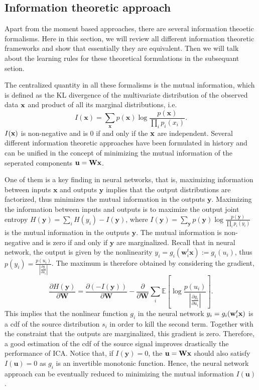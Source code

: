 \documentclass[aps,prl,preprint,superscriptaddress]{revtex4-2}
\begin{document}
\subsection{Information theoretic approach}

Apart from the moment based approaches, there are several information theoetic formalisms. Here in this section, we will review all different information theoretic frameworks and show that essentially they are equivalent. Then we will talk about the learning rules for these theoretical formulations in the subsequant setion. 

The centralized quantity in all these formalisms is the mutual information, which is defined as the KL divergence of the multivariate distribution of the observed data $\bf{x}$ and product of all its marginal distributions, i.e. 
\begin{equation}
I(\mathbf{x}) = \sum_{\mathbf{x}}p(\mathbf{x})\log\frac{p(\mathbf{x})}{\prod_{i}p_{i}(x_{i})}.
\end{equation} $I(\bf{x})$ is non-negative and is 0 if and only if the $\bf{x}$ are independent. Several different information theoretic approaches have been formulated in history and can be unified in the concept of minimizing the mutual information of the seperated components $\bf{u} = \bf{W}\bf{x}$. 

One of them is a key finding in neural networks, that is, maximizing information between inputs $\mathbf{x}$ and outputs $\mathbf{y}$ implies that the output distributions are factorized, thus minimizes the mutual information in the outputs $\mathbf{y}$. Maximizing the information between inputs and outputs is to maximize the output joint entropy $H(\mathbf{y}) = \sum_{i}H(y_{i}) - I(\mathbf{y})$, where $I(\mathbf{y}) = \sum_{\mathbf{y}}p(\mathbf{y})\log\frac{p(\mathbf{y})}{\prod_{i}p_{i}(y_{i})}$ is the mutual information in the outputs $\mathbf{y}$. The mutual information is non-negative and is zero if and only if $\mathbf{y}$ are marginalized. Recall that in neural network, the output is given by the nonlinearity $y_{i} = g_{i}(\mathbf{w}_{i}^{t}\mathbf{x}) := g_{i}(u_{i})$, thus $p(y_{i}) = \frac{p(u_{i})}{|\frac{\partial g_{i}}{\partial u_{i}}|}$. The maximum is therefore obtained by considering the gradient,
\begin{equation}
\frac{\partial H(\mathbf{y})}{\partial \mathbf{W}} = \frac{\partial (-I(\mathbf{y}))}{\partial \mathbf{W}} -\frac{\partial}{\partial \mathbf{W}}\sum_{i} \mathbb{E}[\log \frac{p(u_{i})}{|\frac{\partial g_{i}}{\partial u_{i}}|} ]. 
\end{equation}
This implies that the nonlinear function $g_{i}$ in the neural network $y_{i} = g_{i}(\mathbf{w}_{i}^{t}\bf{x})$ is a cdf of the source distribution $s_{i}$ in order to kill the second term. Together with the constraint that the outputs are marginalized, this gradient is zero. Therefore, a good estimation of the cdf of the source signal improves drastically the performance of ICA. Notice that, if $I(\mathbf{y}) = 0$, the $\mathbf{u} = \bf{W}\bf{x}$ should also satisfy $I(\mathbf{u}) = 0$ as $g_{i}$ is an invertible monotonic function. Hence, the neural network approach can be eventually reduced to minimizing the mutual information $I(\mathbf{u})$ \cite{lee1998independent}.
\end{document}
